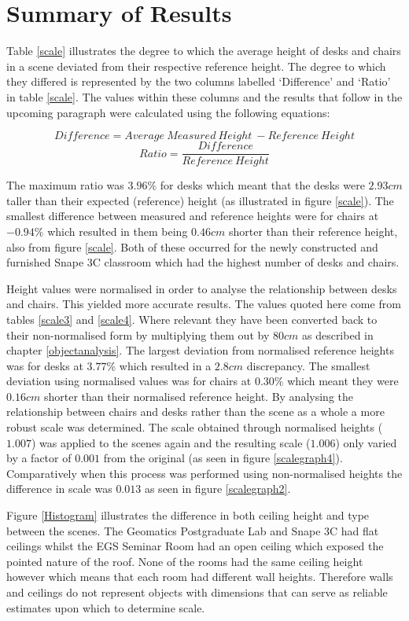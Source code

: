 \section{Summary of Results \label{summaryresults}}
Table \ref{scale} illustrates the degree to which the average height of desks and chairs in a scene deviated from their respective reference height. The degree to which they differed is represented by the two columns labelled `Difference' and `Ratio' in table \ref{scale}. The values within these columns and the results that follow in the upcoming paragraph were calculated using the following equations:

\begin{equation}\label{diff}
Difference = Average\ Measured\ Height\ - Reference\ Height
\end{equation}
\begin{equation}\label{ratio}
Ratio = \frac{Difference}{Reference\ Height}
\end{equation}

The maximum ratio was $3.96\%$ for desks which meant that the desks were $2.93cm$ taller than their expected (reference) height (as illustrated in figure \ref{scale}). The smallest difference between measured and reference heights were for chairs at $-0.94\%$ which resulted in them being $0.46cm$ shorter than their reference height, also from figure \ref{scale}. Both of these occurred for the newly constructed and furnished Snape 3C classroom which had the highest number of desks and chairs.

Height values were normalised in order to analyse the relationship between desks and chairs. This yielded more accurate results. The values quoted here come from tables \ref{scale3} and \ref{scale4}. Where relevant they have been converted back to their non-normalised form by multiplying them out by $80cm$ as described in chapter \ref{objectanalysis}. The largest deviation from normalised reference heights was for desks at $3.77\%$ which resulted in a $2.8cm$ discrepancy. The smallest deviation using normalised values was for chairs at $0.30\%$ which meant they were $0.16cm$ shorter than their normalised reference height. By analysing the relationship between chairs and desks rather than the scene as a whole a more robust scale was determined. The scale obtained through normalised heights ($1.007$) was applied to the scenes again and the resulting scale ($1.006$) only varied by a factor of $0.001$ from the original (as seen in figure \ref{scalegraph4}). Comparatively when this process was performed using non-normalised heights the difference in scale was $0.013$ as seen in figure \ref{scalegraph2}.

Figure \ref{Histogram} illustrates the difference in both ceiling height and type between the scenes. The Geomatics Postgraduate Lab and Snape 3C had flat ceilings whilst the EGS Seminar Room had an open ceiling which exposed the pointed nature of the roof. None of the rooms had the same ceiling height however which means that each room had different wall heights. Therefore walls and ceilings do not represent objects with dimensions that can serve as reliable estimates upon which to determine scale. 

